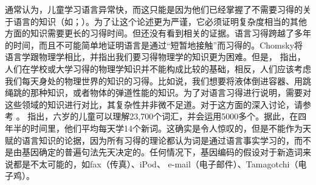 通常认为，儿童学习语言异常快，而这只能是因为他们已经掌握了不需要习得的关于语言的知识（如\citealp[]{Chomsky76c-u}；\citealp[]{Hornstein2013a}）。为了让这个论述更为严谨，它必须证明复杂度相当的其他方面的知识需要更长的习得时间\citep[--218]{Sampson89a}。但还没有看到相关的证据。语言习得跨越了多年的时间，而且不可能简单地证明语言是通过“短暂地接触”而习得的。Chomsky将语言学跟物理学相比，并指出我们要习得物理学的知识更为困难。但是， \citet[]{Sampson89a}指出，人们在学校或大学习得的物理学知识并不能构成比较的基础，相反，人们应该考虑我们每天身处的物理世界的知识的习得。比如说，我们想要将液体倒进容器、用跳绳跳的那种知识，或者物体的弹道性能的知识。为了对语言习得进行说明，需要对这些领域的知识进行对比，其复杂性并非微不足道。对于这方面的深入讨论，请参考 。 \citet[]{MR98a-u}指出，六岁的儿童可以理解23,700个词汇，并会运用5000多个。据此，在四年半的时间里，他们平均每天学14个新词。这确实是令人惊叹的，但是不能作为天赋的语言知识的论据，因为所有习得的理论都认为词是通过语言事实学习的，而不是由基因确定的普遍句法先天决定的。任何情况下，基因编码的假设对于新造词来说都是不太可能的，如fax（传真）、iPod、 e-mail（电子邮件）、Tamagotchi（电子鸡）。
